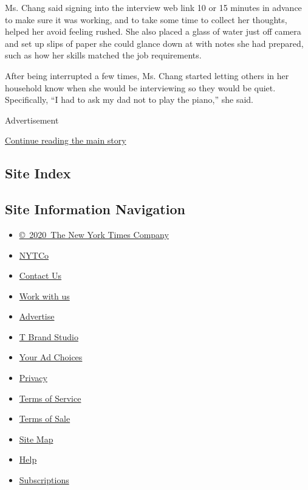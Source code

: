 Ms. Chang said signing into the interview web link 10 or 15 minutes in
advance to make sure it was working, and to take some time to collect
her thoughts, helped her avoid feeling rushed. She also placed a glass
of water just off camera and set up slips of paper she could glance down
at with notes she had prepared, such as how her skills matched the job
requirements.

After being interrupted a few times, Ms. Chang started letting others in
her household know when she would be interviewing so they would be
quiet. Specifically, ``I had to ask my dad not to play the piano,'' she
said.

Advertisement

\protect\hyperlink{after-bottom}{Continue reading the main story}

\hypertarget{site-index}{%
\subsection{Site Index}\label{site-index}}

\hypertarget{site-information-navigation}{%
\subsection{Site Information
Navigation}\label{site-information-navigation}}

\begin{itemize}
\tightlist
\item
  \href{https://help.nytimes3xbfgragh.onion/hc/en-us/articles/115014792127-Copyright-notice}{©~2020~The
  New York Times Company}
\end{itemize}

\begin{itemize}
\tightlist
\item
  \href{https://www.nytco.com/}{NYTCo}
\item
  \href{https://help.nytimes3xbfgragh.onion/hc/en-us/articles/115015385887-Contact-Us}{Contact
  Us}
\item
  \href{https://www.nytco.com/careers/}{Work with us}
\item
  \href{https://nytmediakit.com/}{Advertise}
\item
  \href{http://www.tbrandstudio.com/}{T Brand Studio}
\item
  \href{https://www.nytimes3xbfgragh.onion/privacy/cookie-policy\#how-do-i-manage-trackers}{Your
  Ad Choices}
\item
  \href{https://www.nytimes3xbfgragh.onion/privacy}{Privacy}
\item
  \href{https://help.nytimes3xbfgragh.onion/hc/en-us/articles/115014893428-Terms-of-service}{Terms
  of Service}
\item
  \href{https://help.nytimes3xbfgragh.onion/hc/en-us/articles/115014893968-Terms-of-sale}{Terms
  of Sale}
\item
  \href{https://spiderbites.nytimes3xbfgragh.onion}{Site Map}
\item
  \href{https://help.nytimes3xbfgragh.onion/hc/en-us}{Help}
\item
  \href{https://www.nytimes3xbfgragh.onion/subscription?campaignId=37WXW}{Subscriptions}
\end{itemize}
